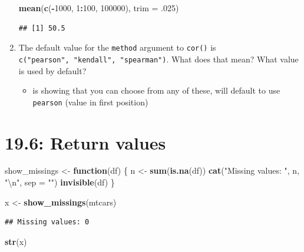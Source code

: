 \documentclass[]{book}
\newenvironment{Shaded}{\begin{snugshade}}{\end{snugshade}}
\newcommand{\CharTok}[1]{\textcolor[rgb]{0.31,0.60,0.02}{#1}}
\newcommand{\ControlFlowTok}[1]{\textcolor[rgb]{0.13,0.29,0.53}{\textbf{#1}}}
\newcommand{\DataTypeTok}[1]{\textcolor[rgb]{0.13,0.29,0.53}{#1}}
\newcommand{\DecValTok}[1]{\textcolor[rgb]{0.00,0.00,0.81}{#1}}
\newcommand{\FloatTok}[1]{\textcolor[rgb]{0.00,0.00,0.81}{#1}}
\newcommand{\KeywordTok}[1]{\textcolor[rgb]{0.13,0.29,0.53}{\textbf{#1}}}
\newcommand{\NormalTok}[1]{#1}
\newcommand{\OperatorTok}[1]{\textcolor[rgb]{0.81,0.36,0.00}{\textbf{#1}}}
\newcommand{\StringTok}[1]{\textcolor[rgb]{0.31,0.60,0.02}{#1}}
\providecommand{\tightlist}{%
  \setlength{\itemsep}{0pt}\setlength{\parskip}{0pt}}
\theoremstyle{definition}
\theoremstyle{definition}
\theoremstyle{definition}
\theoremstyle{remark}
\begin{document}
\begin{enumerate}
\begin{Shaded}
\begin{Highlighting}[]
\KeywordTok{mean}\NormalTok{(}\KeywordTok{c}\NormalTok{(}\OperatorTok{-}\DecValTok{1000}\NormalTok{, }\DecValTok{1}\OperatorTok{:}\DecValTok{100}\NormalTok{, }\DecValTok{100000}\NormalTok{), }\DataTypeTok{trim =} \FloatTok{.025}\NormalTok{) }
\end{Highlighting}
\end{Shaded}

\begin{verbatim}
## [1] 50.5
\end{verbatim}
\item
  The default value for the \texttt{method} argument to \texttt{cor()}
  is \texttt{c("pearson",\ "kendall",\ "spearman")}. What does that
  mean? What value is used by default?

  \begin{itemize}
  \tightlist
  \item
    is showing that you can choose from any of these, will default to
    use \texttt{pearson} (value in first position)
  \end{itemize}
\end{enumerate}

\hypertarget{return-values}{%
\section{19.6: Return values}\label{return-values}}

\begin{Shaded}
\begin{Highlighting}[]
\NormalTok{show_missings <-}\StringTok{ }\ControlFlowTok{function}\NormalTok{(df) \{}
\NormalTok{  n <-}\StringTok{ }\KeywordTok{sum}\NormalTok{(}\KeywordTok{is.na}\NormalTok{(df))}
  \KeywordTok{cat}\NormalTok{(}\StringTok{"Missing values: "}\NormalTok{, n, }\StringTok{"}\CharTok{\textbackslash{}n}\StringTok{"}\NormalTok{, }\DataTypeTok{sep =} \StringTok{""}\NormalTok{)}
  \KeywordTok{invisible}\NormalTok{(df)}
\NormalTok{\}}

\NormalTok{x <-}\StringTok{ }\KeywordTok{show_missings}\NormalTok{(mtcars)}
\end{Highlighting}
\end{Shaded}

\begin{verbatim}
## Missing values: 0
\end{verbatim}

\begin{Shaded}
\begin{Highlighting}[]
\KeywordTok{str}\NormalTok{(x)}
\end{Highlighting}
\end{Shaded}
\end{document}
